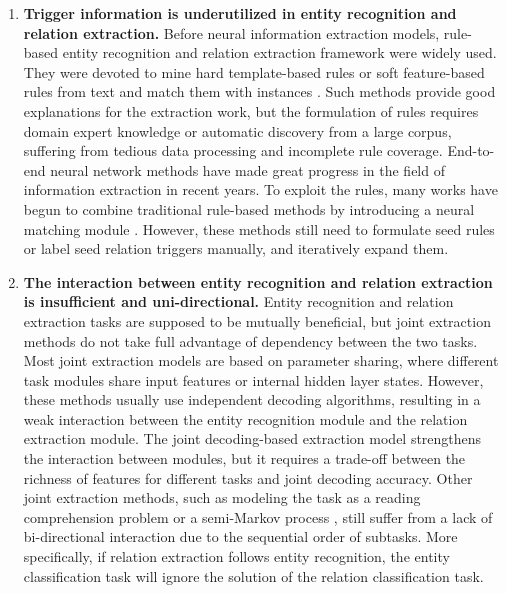 \documentclass[sigconf]{acmart}
\begin{document}
\begin{enumerate}
    \item \textbf{Trigger information is underutilized in entity recognition and relation extraction.} Before neural information extraction models, rule-based entity recognition and relation extraction framework were widely used. They were devoted to mine hard template-based rules or soft feature-based rules from text and match them with instances  \cite{hearst1992automatic, jones1999bootstrapping, agichtein2000snowball, batista2015semi, aone1998sra, miller2000novel, fundel2007relex}. Such methods provide good explanations for the extraction work, but the formulation of rules requires domain expert knowledge or automatic discovery from a large corpus, suffering from tedious data processing and incomplete rule coverage.    End-to-end neural network methods have made great progress in the field of information extraction in recent years.  To exploit the rules, many works have begun to combine traditional rule-based methods by introducing a neural matching module \cite{zhou2020nero, lin2020triggerner,wang2019learning}. However, these methods still need to formulate seed rules or label seed relation triggers manually, and iteratively expand them.
    \item \textbf{The interaction between entity recognition and relation extraction is insufficient and uni-directional.} Entity recognition and relation extraction tasks are supposed to be mutually beneficial, but joint extraction methods do not take full advantage of dependency between the two tasks. Most joint extraction models are based on parameter sharing, where different task modules share input features or internal hidden layer states. However, these methods usually use independent decoding algorithms, resulting in a weak interaction between the entity recognition module and the relation extraction module. The joint decoding-based extraction model strengthens the interaction between modules, but it requires a trade-off between the richness of features for different tasks and joint decoding accuracy. Other joint extraction methods, such as modeling the task as a reading comprehension problem \cite{li2019entity, zhaoasking} or a semi-Markov process \cite{takanobu2019hierarchical},  still suffer from a lack of bi-directional interaction due to the sequential order of subtasks. 
    More specifically, if relation extraction follows entity recognition, the entity classification task will ignore the solution of the relation classification task. 

\end{enumerate}
\end{document}
